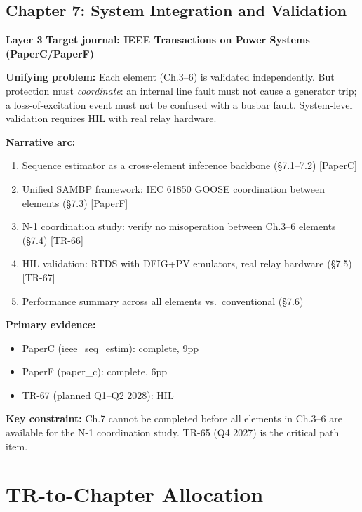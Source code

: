 \documentclass[11pt, a4paper]{article}
\newcommand{\chtag}[2]{\colorbox{#1}{\color{white}\textbf{\small #2}}}
\begin{document}
\subsection{Chapter 7: System Integration and Validation}

\chtag{C6col}{Layer 3} \quad \textbf{Target journal: IEEE Transactions on Power Systems (PaperC/PaperF)}

\textbf{Unifying problem:} Each element (Ch.3--6) is validated independently.
But protection must \emph{coordinate}: an internal line fault must not cause a
generator trip; a loss-of-excitation event must not be confused with a busbar
fault.  System-level validation requires HIL with real relay hardware.

\textbf{Narrative arc:}
\begin{enumerate}[nosep]
  \item Sequence estimator as a cross-element inference backbone (§7.1--7.2) [PaperC]
  \item Unified SAMBP framework: IEC 61850 GOOSE coordination between elements (§7.3) [PaperF]
  \item N-1 coordination study: verify no misoperation between Ch.3--6 elements (§7.4) [TR-66]
  \item HIL validation: RTDS with DFIG+PV emulators, real relay hardware (§7.5) [TR-67]
  \item Performance summary across all elements vs.\ conventional (§7.6)
\end{enumerate}

\textbf{Primary evidence:}
\begin{itemize}[nosep]
  \item PaperC (ieee\_seq\_estim): complete, 9pp
  \item PaperF (paper\_c): complete, 6pp
  \item TR-67 (planned Q1--Q2 2028): HIL
\end{itemize}

\textbf{Key constraint:} Ch.7 cannot be completed before all elements in Ch.3--6
are available for the N-1 coordination study.  TR-65 (Q4 2027) is the
critical path item.

\section{TR-to-Chapter Allocation}
\label{sec:allocation}
\end{document}
